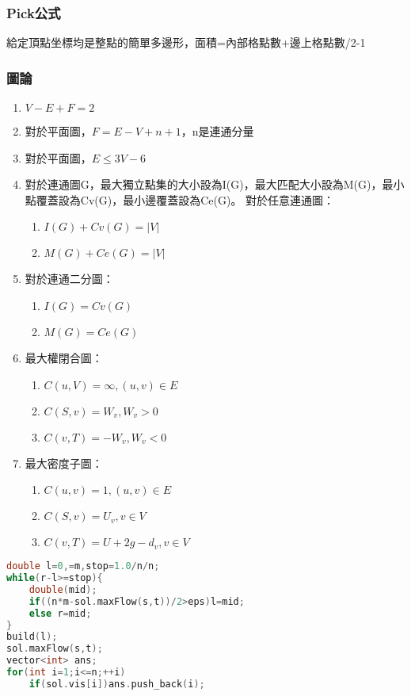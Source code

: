 %

\subsubsection{Pick公式}
給定頂點坐標均是整點的簡單多邊形，面積=內部格點數+邊上格點數/2-1

\subsubsection{圖論}
\begin{enumerate}\itemsep = -5pt
\item $V-E+F=2$
\item 對於平面圖，$F=E-V+n+1$，n是連通分量
\item 對於平面圖，$E\leq 3V-6$
\item 對於連通圖G，最大獨立點集的大小設為I(G)，最大匹配大小設為M(G)，最小點覆蓋設為Cv(G)，最小邊覆蓋設為Ce(G)。
對於任意連通圖：
	\begin{enumerate}\itemsep = -5pt
	\item $I(G)+Cv(G)=|V|$
	\item $M(G)+Ce(G)=|V|$
	\end{enumerate}
\item 對於連通二分圖：
	\begin{enumerate}\itemsep = -5pt
	\item $I(G)=Cv(G)$
	\item $M(G)=Ce(G)$
	\end{enumerate}
\item 最大權閉合圖：
	\begin{enumerate}\itemsep = -5pt
	\item $C(u,V)=\infty ,(u,v)\in E$
	\item $C(S,v)=W_v ,W_v>0$
	\item $C(v,T)=-W_v ,W_v<0$
	\end{enumerate}
\item 最大密度子圖：
	\begin{enumerate}\itemsep = -5pt
	\item $C(u,v)=1 ,(u,v)\in E$
	\item $C(S,v)=U_v ,v \in V$
	\item $C(v,T)=U+2g-d_v ,v \in V$
	\end{enumerate}
\end{enumerate}
\begin{lstlisting}[language=C++]
double l=0,=m,stop=1.0/n/n;
while(r-l>=stop){
	double(mid);
	if((n*m-sol.maxFlow(s,t))/2>eps)l=mid;
	else r=mid;
}
build(l);
sol.maxFlow(s,t);
vector<int> ans;
for(int i=1;i<=n;++i)
	if(sol.vis[i])ans.push_back(i);
\end{lstlisting}


